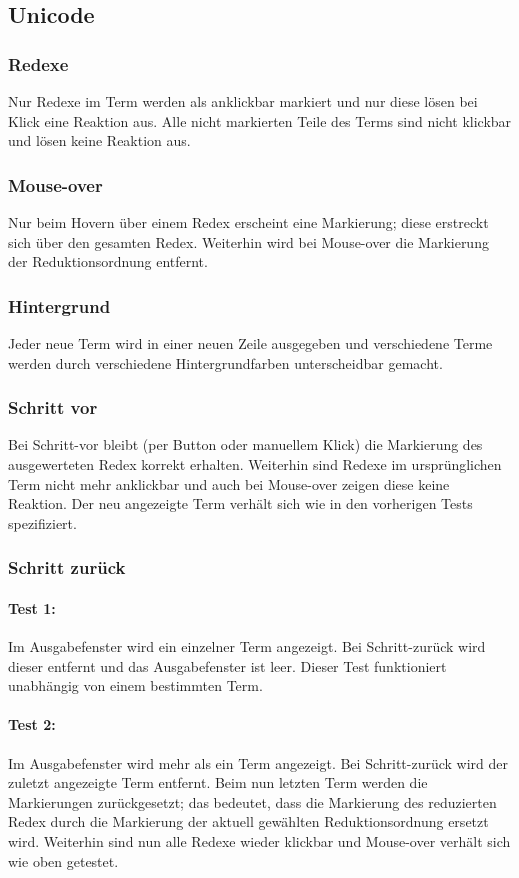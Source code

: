 \documentclass[parskip=full,11pt,openany]{scrreprt}
\begin{document}
\subsection{Unicode}
\subsubsection{Redexe}
Nur Redexe im Term werden als anklickbar markiert und nur diese lösen bei Klick eine Reaktion aus. Alle nicht markierten Teile des Terms sind nicht klickbar und lösen keine Reaktion aus.


\subsubsection{Mouse-over}
Nur beim Hovern über einem Redex erscheint eine Markierung; diese erstreckt sich über den gesamten Redex. Weiterhin wird bei Mouse-over die Markierung der Reduktionsordnung entfernt. 


\subsubsection{Hintergrund}
Jeder neue Term wird in einer neuen Zeile ausgegeben und verschiedene Terme werden durch verschiedene Hintergrundfarben unterscheidbar gemacht.


\subsubsection{Schritt vor}
Bei Schritt-vor bleibt (per Button oder manuellem Klick) die Markierung des ausgewerteten Redex korrekt erhalten. Weiterhin sind Redexe im ursprünglichen Term nicht mehr anklickbar und auch bei Mouse-over zeigen diese keine Reaktion. Der neu angezeigte Term verhält sich wie in den vorherigen Tests spezifiziert.

\subsubsection{Schritt zurück}
\paragraph{Test 1:} 
Im Ausgabefenster wird ein einzelner Term angezeigt. Bei Schritt-zurück wird dieser entfernt und das Ausgabefenster ist leer. 
Dieser Test funktioniert unabhängig von einem bestimmten Term.

\paragraph{Test 2:} 
Im Ausgabefenster wird mehr als ein Term angezeigt. Bei Schritt-zurück wird der zuletzt angezeigte Term entfernt.
Beim nun letzten Term werden die Markierungen zurückgesetzt; das bedeutet, dass die Markierung des reduzierten Redex durch die Markierung der aktuell gewählten Reduktionsordnung ersetzt wird. 
Weiterhin sind nun alle Redexe wieder klickbar und Mouse-over verhält sich wie oben getestet.
\end{document}
